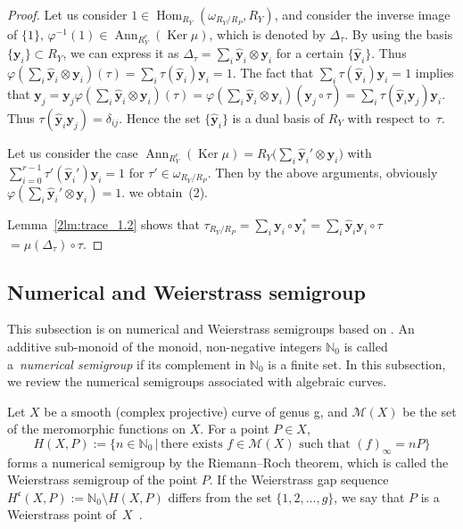 \documentclass[10pt,a4paper]{amsart}
\def\NN{{\mathbb N}}
\def\bby{{\mathbf y}}
\def\cM{{\mathcal M}}
\def\fc{{\mathfrak c}}
\def\hby{\widehat {{\mathbf y}}}
\def\Ker{\operatorname{Ker}}
\numberwithin{equation}{section}
\begin{document}
\begin{proof}Let us consider $1 \in \operatorname{Hom}_{R_Y}(\omega_{R_Y/R_P}, R_Y)$, and consider the inverse image of $\{1\}$, $\varphi^{-1}(1)\in \operatorname{Ann}_{R_Y^e}(\Ker \mu)$, which is denoted by $\Delta_\tau$. By using the basis $\{\bby_i\} \subset R_Y$, we can express it as $\Delta_\tau=\sum_{i}\hby_i \otimes \bby_i$ for a certain $\{\hby_i\}$.
Thus $\varphi(\sum_i \hby_i \otimes \bby_i)(\tau)=\sum_i \tau(\hby_i) \bby_i=1$.
The fact that $\sum_i \tau(\hby_i) \bby_i=1$ implies that $\bby_j=\bby_j\varphi(\sum_i \hby_i \otimes \bby_i)(\tau)=\varphi(\sum_i \hby_i \otimes \bby_i)(\bby_j\circ \tau)=\sum_i \tau(\hby_i \bby_j)\bby_i$.
Thus $\tau(\hby_i \bby_j)=\delta_{i j}$.
Hence the set $\{\hby_i\}$ is a dual basis of $R_Y$ with respect to~$\tau$.

Let us consider the case $\operatorname{Ann}_{R_Y^e}(\Ker \mu)=R_Y\big(\sum_i \hby_i' \otimes \bby_i\big)$ with $\sum_{i=0}^{r-1}\tau'( \hby_i')\bby_i =1$ for ${\tau' \in \omega_{R_Y/R_P}}$. Then by the above arguments, obviously $\varphi(\sum_i \hby_i' \otimes \bby_i)=1$. we obtain~(2).

Lemma~\ref{2lm:trace_1.2} shows that $\tau_{R_Y/R_P}=\sum_i \bby_i\circ \bby_i^*=\sum_i \hby_i \bby_i\circ \tau$ $=\mu(\Delta_\tau)\circ \tau$.
\end{proof}

\subsection{Numerical and Weierstrass semigroup}\label{2sc:WSG}


This subsection is on numerical and Weierstrass semigroups based on \cite{ADGS2016, KMP13}.
An additive sub-monoid of the monoid, non-negative integers $\NN_0$ is called a~\emph{numerical semigroup} if its complement in $\NN_0$ is a finite set.
In this subsection, we review the numerical semigroups associated with algebraic curves.

Let $X$ be a smooth (complex projective) curve of genus g, and $\cM(X)$ be the set of the meromorphic functions on $X$.
For a point $P \in X$,
\[
 H(X,P):= \{n \in \NN_0\, |\, \text{there exists } f \in \cM(X)
 \text{ such that } (f)_\infty = n P \}
\]
forms a numerical semigroup by the Riemann--Roch theorem, which is called the Weierstrass semigroup of the point $P$.
If the Weierstrass gap sequence $H^\fc(X,P):=\NN_0 \setminus H(X, P)$ differs from the set $\{1, 2, \dots, g\}$, we say that $P$ is a Weierstrass point of~$X$~\cite{FarkasKra}.
\end{document}
